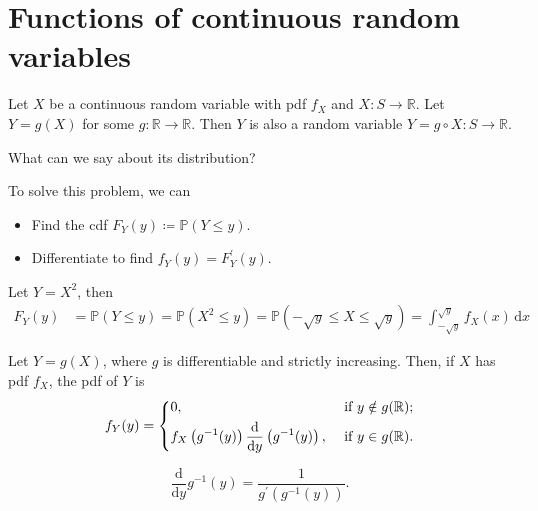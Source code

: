 \section{Functions of continuous random variables}
Let \(X\) be a continuous random variable with pdf \(f_X\) and \(X: S \to \mathbb{R}\). Let \(Y = g(X)\) for some \(g: \mathbb{R} \to \mathbb{R}\). Then \(Y\) is also a random variable \(Y = g \circ X:S \to \mathbb{R}\). 

\begin{question}
    What can we say about its distribution?
\end{question}

To solve this problem, we can 
\begin{itemize}
    \item [1.] Find the cdf \(F_Y(y) \coloneqq \mathbb{P} (Y \le y)\). 
    \item [2.] Differentiate to find \(f_Y(y) = F_Y^{\prime} (y)\).  
\end{itemize}

\begin{eg}
    Let \(Y = X^2\), then
    \begin{align*}
        F_Y(y) &= \mathbb{P} (Y \le y) = \mathbb{P} (X^2 \le y) = \mathbb{P} (-\sqrt{y} \le X \le \sqrt{y}) = \int _{-\sqrt{y} }^{\sqrt{y}} f_X(x) \, \mathrm{d} x 
    \end{align*} 
\end{eg}

\begin{theorem}
    Let \(Y = g(X)\), where \(g\) is differentiable and strictly increasing. Then, if \(X\) has pdf \(f_X\), the pdf of \(Y\) is 
    \[
        f_Y(y) = \begin{dcases}
            0, &\text{ if } y \notin g(\mathbb{R});\\
            f_X \left( g^{-1}(y) \right) \frac{\mathrm{d}}{\mathrm{d}y} \left( g^{-1}(y) \right) , &\text{ if } y \in g(\mathbb{R}).
        \end{dcases}
    \]   

    \begin{remark}
        \[
            \frac{\mathrm{d}}{\mathrm{d}y} g^{-1} (y) = \frac{1}{g^{\prime} \left( g^{-1}(y) \right) }. 
        \]
    \end{remark}
\end{theorem}

